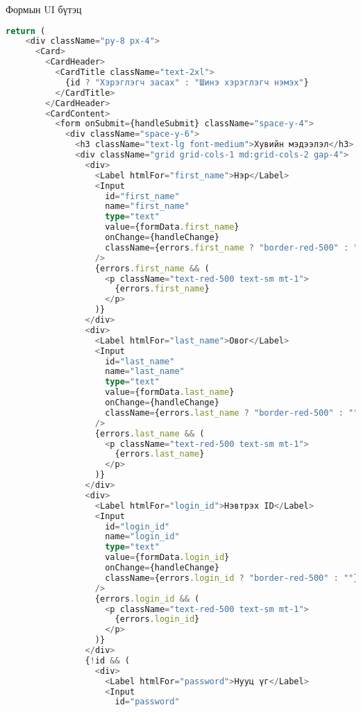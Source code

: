 Формын UI бүтэц
\begin{lstlisting}[language=Typescript, caption=UI бүтэц, frame=single]
	return (
    <div className="py-8 px-4">
      <Card>
        <CardHeader>
          <CardTitle className="text-2xl">
            {id ? "Хэрэглэгч засах" : "Шинэ хэрэглэгч нэмэх"}
          </CardTitle>
        </CardHeader>
        <CardContent>
          <form onSubmit={handleSubmit} className="space-y-4">
            <div className="space-y-6">
              <h3 className="text-lg font-medium">Хувийн мэдээлэл</h3>
              <div className="grid grid-cols-1 md:grid-cols-2 gap-4">
                <div>
                  <Label htmlFor="first_name">Нэр</Label>
                  <Input
                    id="first_name"
                    name="first_name"
                    type="text"
                    value={formData.first_name}
                    onChange={handleChange}
                    className={errors.first_name ? "border-red-500" : ""}
                  />
                  {errors.first_name && (
                    <p className="text-red-500 text-sm mt-1">
                      {errors.first_name}
                    </p>
                  )}
                </div>
                <div>
                  <Label htmlFor="last_name">Овог</Label>
                  <Input
                    id="last_name"
                    name="last_name"
                    type="text"
                    value={formData.last_name}
                    onChange={handleChange}
                    className={errors.last_name ? "border-red-500" : ""}
                  />
                  {errors.last_name && (
                    <p className="text-red-500 text-sm mt-1">
                      {errors.last_name}
                    </p>
                  )}
                </div>
                <div>
                  <Label htmlFor="login_id">Нэвтрэх ID</Label>
                  <Input
                    id="login_id"
                    name="login_id"
                    type="text"
                    value={formData.login_id}
                    onChange={handleChange}
                    className={errors.login_id ? "border-red-500" : ""}
                  />
                  {errors.login_id && (
                    <p className="text-red-500 text-sm mt-1">
                      {errors.login_id}
                    </p>
                  )}
                </div>
                {!id && (
                  <div>
                    <Label htmlFor="password">Нууц үг</Label>
                    <Input
                      id="password"

\end{lstlisting}
